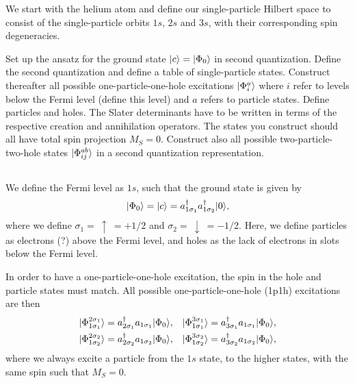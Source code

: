 We start with the helium atom and define our single-particle Hilbert
space to consist of the single-particle orbits \(1s\), \(2s\) and \(3s\),
with their corresponding spin degeneracies.

Set up the ansatz for the ground state \(\lvert c\rangle = \lvert\Phi_0\rangle\) in second quantization.
Define the second quantization and define a table of single-particle states.
Construct thereafter all possible one-particle-one-hole
excitations \(\lvert\Phi_i^a\rangle\) where \(i\) refer to levels below the Fermi level (define this level) and \(a\) refers to particle states.
Define particles and holes.
The Slater determinants have to be written in terms of the respective creation and annihilation operators.
The states you construct should all have total spin projection \(M_S=0\).
Construct also all possible two-particle-two-hole states \(\lvert\Phi_{ij}^{ab}\rangle\) in a second quantization
representation.

\subsection{}
We define the Fermi level as \(1s\), such that the ground state is given by
\begin{equation}
    \lvert\Phi_0\rangle = \lvert c\rangle = a_{1\sigma_1}^\dagger a_{1\sigma_2}^\dagger \lvert0\rangle,
\end{equation}
where we define $\sigma_1 = \ \uparrow \ = +1/2$ and $\sigma_2 = \ \downarrow \ = -1/2$.
Here, we define particles as electrons (?) above the Fermi level, and holes as the lack of electrons in slots below the Fermi level.

In order to have a one-particle-one-hole excitation, the spin in the hole and particle states must match.
All possible one-particle-one-hole (1p1h) excitations are then
\begin{align*}
    \lvert\Phi_{1\sigma_1}^{2\sigma_1}\rangle &= a_{2\sigma_1}^\dagger a_{1\sigma_1} \lvert\Phi_0\rangle, &
    \lvert\Phi_{1\sigma_1}^{3\sigma_1}\rangle &= a_{3\sigma_1}^\dagger a_{1\sigma_1} \lvert\Phi_0\rangle, \\
    \lvert\Phi_{1\sigma_2}^{2\sigma_2}\rangle &= a_{2\sigma_2}^\dagger a_{1\sigma_2} \lvert\Phi_0\rangle, &
    \lvert\Phi_{1\sigma_2}^{3\sigma_2}\rangle &= a_{3\sigma_2}^\dagger a_{1\sigma_2} \lvert\Phi_0\rangle,
\end{align*}
where we always excite a particle from the $1s$ state, to the higher states, with the same spin such that $M_S = 0$.

